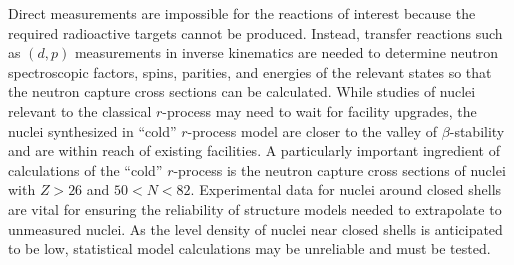 {%
Direct measurements are impossible for the reactions of interest %
 because  the required radioactive targets cannot be produced. Instead, transfer reactions such as $(d,p)$ measurements in inverse kinematics are needed to determine neutron spectroscopic factors, spins, parities, and energies of the relevant states so that the neutron capture cross sections can be calculated.
While studies of nuclei relevant to the classical $r$-process may need to wait for facility upgrades, the nuclei synthesized in ``cold'' %
$r$-process model %
are closer to the valley of $\beta$-stability %
and are %
within reach %
of existing facilities.
A particularly important ingredient of calculations of the ``cold'' $r$-process %
is
the neutron capture cross sections of nuclei with $Z>26$ and $50<N<82$. Experimental data for nuclei around closed shells are vital for ensuring the reliability of structure models needed to extrapolate to unmeasured nuclei. As the level density of nuclei near closed shells is anticipated to be low, statistical model calculations may be unreliable and must be tested. %

\rhead{\desctext{\statename}}

}
